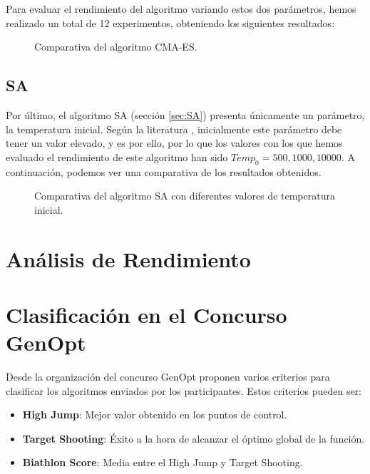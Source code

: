 Para evaluar el rendimiento del algoritmo variando estos dos parámetros, hemos realizado un total de 12 experimentos, obteniendo los siguientes resultados:

\begin{figure}[!ht]
  \centering
	\captionsetup{justification=centering}
  \caption{Comparativa del algoritmo CMA-ES.}
\end{figure}

\subsection{SA}\label{sec:paramSA}

Por último, el algoritmo SA (sección \ref{sec:SA}) presenta únicamente un parámetro, la temperatura inicial. Según la literatura \cite{metabook}, inicialmente este parámetro debe tener un valor elevado, y es por ello, por lo que los valores con los que hemos evaluado el rendimiento de este algoritmo han sido $Temp_{0} = 500, 1000, 10000$. A continuación, podemos ver una comparativa de los resultados obtenidos. 

\begin{figure}[!ht]
  \centering
	\captionsetup{justification=centering}
  \caption{Comparativa del algoritmo SA con diferentes valores de temperatura inicial.}
\end{figure}

\section{Análisis de Rendimiento}\label{sec:PERFORMANCE}


\section{Clasificación en el Concurso GenOpt}\label{sec:Competition}

Desde la organización del concurso GenOpt proponen varios criterios para clasificar los algoritmos enviados por los participantes. Estos criterios pueden ser:

\begin{itemize}
    	  	\item \textbf{High Jump}: Mejor valor obtenido en los puntos de control.
    	  	\item \textbf{Target Shooting}: Éxito a la hora de alcanzar el óptimo global de la función.
    	  	\item \textbf{Biathlon Score}: Media entre el High Jump y Target Shooting.
\end{itemize}

